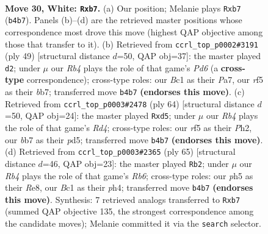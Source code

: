 \documentclass[11pt]{article}
\begin{document}
\clearpage

\begin{figure}[p]\centering
\begin{subfigure}{0.46\textwidth}\centering
\resizebox{\linewidth}{!}{%
\newchessgame
\chessboard[
  setfen={r7/1b3pk1/2p3p1/2P2r1p/BR5P/8/P2N2PK/2B5 w - - 1 30},
  showmover=false,
  pgfstyle=straightmove, color=movearrow, markmove={b4-b7}
]}
\caption{}
\end{subfigure}\hfill
\begin{subfigure}{0.46\textwidth}\centering
\resizebox{\linewidth}{!}{%
\newchessgame
\chessboard[
  setfen={6k1/pB4b1/3r2pp/2p5/n1R5/P2p2P1/1P3P1P/5RK1 b - - 7 25},
  showmover=false,
  pgfstyle=straightmove, color=movearrow, markmove={d3-d2}
]}
\caption{}
\end{subfigure}
\\[4pt]
\begin{subfigure}{0.46\textwidth}\centering
\resizebox{\linewidth}{!}{%
\newchessgame
\chessboard[
  setfen={2R5/6pk/r4pbp/3p4/pB1R4/P4P2/1r4PP/6K1 w - - 0 33},
  showmover=false,
  pgfstyle=straightmove, color=movearrow, markmove={d4-d5}
]}
\caption{}
\end{subfigure}\hfill
\begin{subfigure}{0.46\textwidth}\centering
\resizebox{\linewidth}{!}{%
\newchessgame
\chessboard[
  setfen={4rk2/6pp/p2R3b/5P2/2PK3P/1r1B1pP1/5P2/7R b - - 0 33},
  showmover=false,
  pgfstyle=straightmove, color=movearrow, markmove={b3-b2}
]}
\caption{}
\end{subfigure}
\caption{\textbf{Move 30, White: \texttt{Rxb7}.} (a) Our position; Melanie plays \texttt{Rxb7} (\texttt{b4b7}). Panels (b)--(d) are the retrieved master positions whose correspondence most drove this move (highest QAP objective among those that transfer to it). (b) Retrieved from \texttt{ccrl\_top\_p0002\#3191} (ply 49) [structural distance $d$=50, QAP obj=37]: the master played \texttt{d2}; under $\mu$ our \emph{Rb4} plays the role of that game's \emph{Pd6} (a \textbf{cross-type} correspondence); cross-type roles: our \emph{B}c1 as their \emph{P}a7, our \emph{r}f5 as their \emph{b}b7; transferred move \texttt{b4b7} \textbf{(endorses this move)}. (c) Retrieved from \texttt{ccrl\_top\_p0003\#2478} (ply 64) [structural distance $d$=50, QAP obj=24]: the master played \texttt{Rxd5}; under $\mu$ our \emph{Rb4} plays the role of that game's \emph{Rd4}; cross-type roles: our \emph{r}f5 as their \emph{P}h2, our \emph{b}b7 as their \emph{p}d5; transferred move \texttt{b4b7} \textbf{(endorses this move)}. (d) Retrieved from \texttt{ccrl\_top\_p0003\#2365} (ply 65) [structural distance $d$=46, QAP obj=23]: the master played \texttt{Rb2}; under $\mu$ our \emph{Rb4} plays the role of that game's \emph{Rb6}; cross-type roles: our \emph{p}h5 as their \emph{R}e8, our \emph{B}c1 as their \emph{p}h4; transferred move \texttt{b4b7} \textbf{(endorses this move)}. Synthesis: 7 retrieved analogs transferred to \texttt{Rxb7} (summed QAP objective 135, the strongest correspondence among the candidate moves); Melanie committed it via the \texttt{search} selector.}
\label{fig:thought-m58}
\end{figure}
\end{document}
